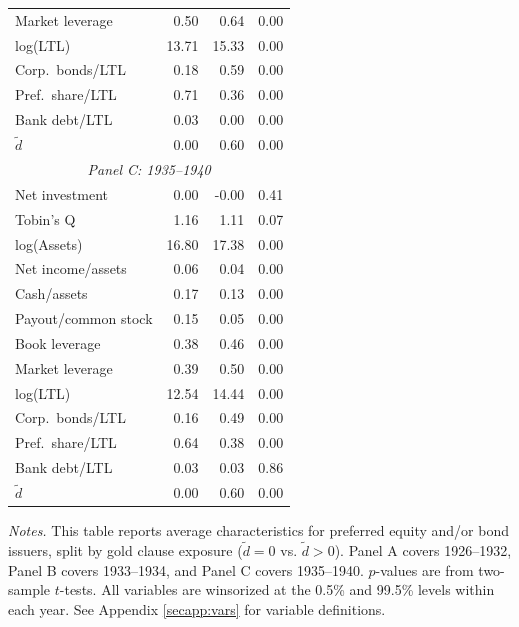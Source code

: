 \begin{table}[p]
\begin{threeparttable}
\begin{tabular}{lrrr}
            Market leverage & 0.50 & 0.64 & 0.00 \\
            log(LTL) & 13.71 & 15.33 & 0.00 \\
            Corp.\ bonds/LTL & 0.18 & 0.59 & 0.00 \\
            Pref.\ share/LTL & 0.71 & 0.36 & 0.00 \\
            Bank debt/LTL & 0.03 & 0.00 & 0.00 \\
            \ensuremath{\tilde{d}} & 0.00 & 0.60 & 0.00 \\
            \midrule
            \multicolumn{4}{c}{\textit{Panel C: 1935--1940}} \\
            \midrule
            Net investment & 0.00 & -0.00 & 0.41 \\
            Tobin's Q & 1.16 & 1.11 & 0.07 \\
            log(Assets) & 16.80 & 17.38 & 0.00 \\
            Net income/assets & 0.06 & 0.04 & 0.00 \\
            Cash/assets & 0.17 & 0.13 & 0.00 \\
            Payout/common stock & 0.15 & 0.05 & 0.00 \\
            Book leverage & 0.38 & 0.46 & 0.00 \\
            Market leverage & 0.39 & 0.50 & 0.00 \\
            log(LTL) & 12.54 & 14.44 & 0.00 \\
            Corp.\ bonds/LTL & 0.16 & 0.49 & 0.00 \\
            Pref.\ share/LTL & 0.64 & 0.38 & 0.00 \\
            Bank debt/LTL & 0.03 & 0.03 & 0.86 \\
            \ensuremath{\tilde{d}} & 0.00 & 0.60 & 0.00 \\
            \bottomrule
        \end{tabular}
    \end{threeparttable}
    
    \vspace*{3mm} \justifying \noindent
\scriptsize{\textit{Notes.} This table reports average characteristics for preferred equity and/or bond issuers, split by gold clause exposure ($\tilde{d} = 0$ vs. $\tilde{d} > 0$). Panel A covers 1926--1932, Panel B covers 1933--1934, and Panel C covers 1935--1940. $p$-values are from two-sample $t$-tests. All variables are winsorized at the 0.5\% and 99.5\% levels within each year. See Appendix \ref{secapp:vars} for variable definitions.}
\end{table}